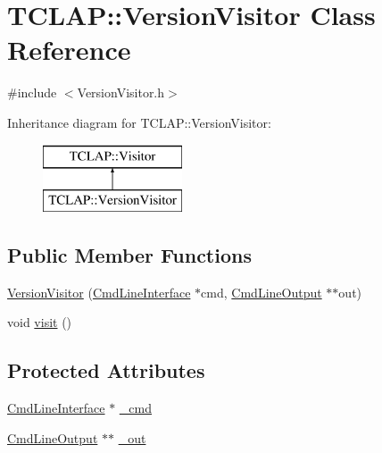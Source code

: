 \hypertarget{class_t_c_l_a_p_1_1_version_visitor}{}\section{T\+C\+L\+A\+P\+:\+:Version\+Visitor Class Reference}
\label{class_t_c_l_a_p_1_1_version_visitor}


{\ttfamily \#include $<$Version\+Visitor.\+h$>$}

Inheritance diagram for T\+C\+L\+A\+P\+:\+:Version\+Visitor\+:\begin{figure}[H]
\begin{center}
\leavevmode
\includegraphics[height=2.000000cm]{class_t_c_l_a_p_1_1_version_visitor}
\end{center}
\end{figure}
\subsection*{Public Member Functions}
\begin{DoxyCompactItemize}
\item 
\hyperlink{class_t_c_l_a_p_1_1_version_visitor_a6e5c16f245e2333dcc568dc9c4e6d537}{Version\+Visitor} (\hyperlink{class_t_c_l_a_p_1_1_cmd_line_interface}{Cmd\+Line\+Interface} $\ast$cmd, \hyperlink{class_t_c_l_a_p_1_1_cmd_line_output}{Cmd\+Line\+Output} $\ast$$\ast$out)
\item 
void \hyperlink{class_t_c_l_a_p_1_1_version_visitor_a30b0d5bd22ac41364d027b94bded4fc0}{visit} ()
\end{DoxyCompactItemize}
\subsection*{Protected Attributes}
\begin{DoxyCompactItemize}
\item 
\hyperlink{class_t_c_l_a_p_1_1_cmd_line_interface}{Cmd\+Line\+Interface} $\ast$ \hyperlink{class_t_c_l_a_p_1_1_version_visitor_ac789d900e73daa8b4b53a1e9b80b756e}{\+\_\+cmd}
\item 
\hyperlink{class_t_c_l_a_p_1_1_cmd_line_output}{Cmd\+Line\+Output} $\ast$$\ast$ \hyperlink{class_t_c_l_a_p_1_1_version_visitor_ab4c9f44a2bd62830e42f79b35ac4d300}{\+\_\+out}
\end{DoxyCompactItemize}


